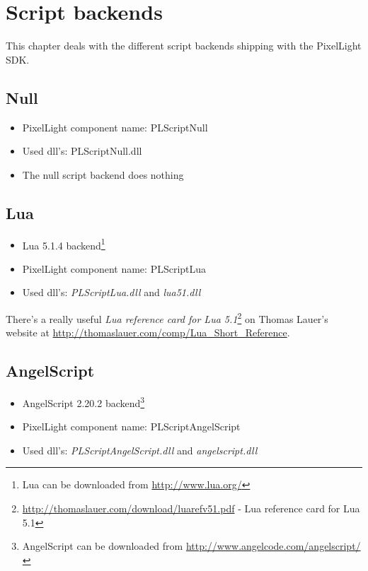 \chapter{Script backends}
This chapter deals with the different script backends shipping with the PixelLight SDK.




\section{Null}
\begin{itemize}
\item PixelLight component name: PLScriptNull
\item Used dll's: PLScriptNull.dll
\item The null script backend does nothing
\end{itemize}




\section{Lua}
\begin{itemize}
\item Lua 5.1.4 backend\footnote{Lua can be downloaded from \url{http://www.lua.org/}}
\item PixelLight component name: PLScriptLua
\item Used dll's: \emph{PLScriptLua.dll} and \emph{lua51.dll}
\end{itemize}

There's a really useful \emph{Lua reference card for Lua 5.1}\footnote{\url{http://thomaslauer.com/download/luarefv51.pdf} - Lua reference card for Lua 5.1} on Thomas Lauer's website at \url{http://thomaslauer.com/comp/Lua_Short_Reference}.




\section{AngelScript}
\begin{itemize}
\item AngelScript 2.20.2 backend\footnote{AngelScript can be downloaded from \url{http://www.angelcode.com/angelscript/}}
\item PixelLight component name: PLScriptAngelScript
\item Used dll's: \emph{PLScriptAngelScript.dll} and \emph{angelscript.dll}
\end{itemize}

